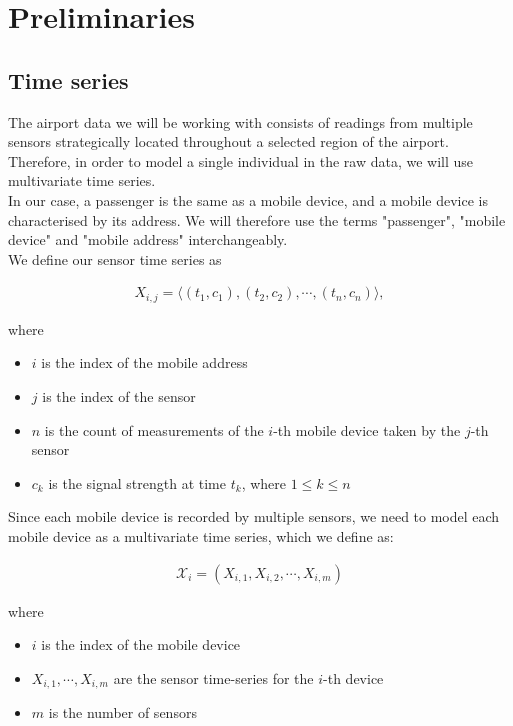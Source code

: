 \chapter{Preliminaries}\label{chap:Prelimi}
\section{Time series}
\label{sec:time_series}
The airport data we will be working with consists of readings from multiple sensors strategically located throughout a selected region of the airport. Therefore, in order to model a single individual in the raw data, we will use multivariate time series. \\

In our case, a passenger is the same as a mobile device, and a mobile device is characterised by its address. We will therefore use the terms "passenger", "mobile device" and "mobile address" interchangeably. \\


We define our sensor time series as

\begin{align*}
	X_{i,j} = \langle (t_1, c_1), (t_2, c_2), \cdots, (t_n, c_n)\rangle,
\end{align*}

where

\begin{itemize}
	\item $i$ is the index of the mobile address
	\item $j$ is the index of the sensor
	\item $n$ is the count of measurements of the $i$-th mobile device taken by the $j$-th sensor
	\item $c_k$ is the signal strength at time $t_k$, where $1 \leq k \leq n$
\end{itemize}

Since each mobile device is recorded by multiple sensors, we need to model each mobile device as a multivariate time series, which we define as:

\begin{align*}
	\mathcal{X}_i = (X_{i,1}, X_{i,2}, \cdots, X_{i,m})
\end{align*}

\pagebreak

where

\begin{itemize}
	\item $i$ is the index of the mobile device
	\item $X_{i,1}, \cdots, X_{i,m}$ are the sensor time-series for the $i$-th device
	\item $m$ is the number of sensors
\end{itemize}

